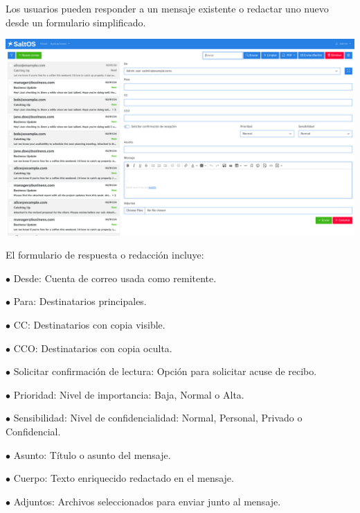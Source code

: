 \documentclass[a4paper]{article}
\begin{document}
Los usuarios pueden responder a un mensaje existente o redactar uno nuevo desde un formulario simplificado.

\begin{center}\includegraphics[width=1\textwidth]{../ujest/snaps/test-screenshots-js-screenshots-emails-emails-create-es-es-1-snap.png}\end{center}

El formulario de respuesta o redacción incluye:

\begin{compactitem}
\item[\color{myblue}$\bullet$] Desde: Cuenta de correo usada como remitente.
\item[\color{myblue}$\bullet$] Para: Destinatarios principales.
\item[\color{myblue}$\bullet$] CC: Destinatarios con copia visible.
\item[\color{myblue}$\bullet$] CCO: Destinatarios con copia oculta.
\item[\color{myblue}$\bullet$] Solicitar confirmación de lectura: Opción para solicitar acuse de recibo.
\item[\color{myblue}$\bullet$] Prioridad: Nivel de importancia: Baja, Normal o Alta.
\item[\color{myblue}$\bullet$] Sensibilidad: Nivel de confidencialidad: Normal, Personal, Privado o Confidencial.
\item[\color{myblue}$\bullet$] Asunto: Título o asunto del mensaje.
\item[\color{myblue}$\bullet$] Cuerpo: Texto enriquecido redactado en el mensaje.
\item[\color{myblue}$\bullet$] Adjuntos: Archivos seleccionados para enviar junto al mensaje.
\end{compactitem}
\end{document}

